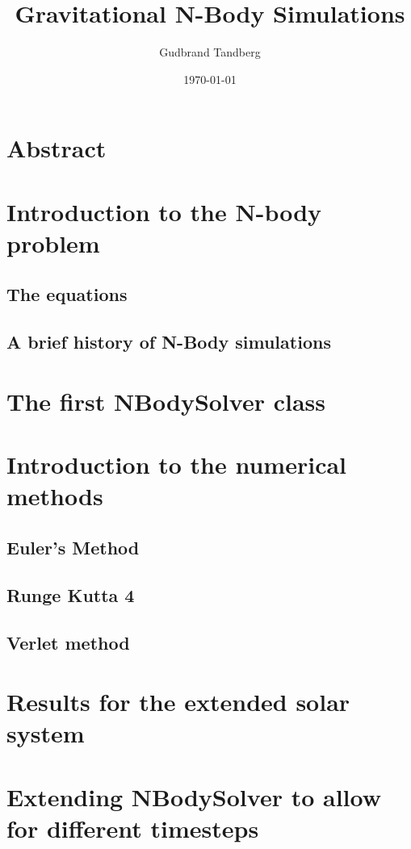 \documentclass[11pt, oneside]{article}   	%
\title{Gravitational N-Body Simulations}
\author{Gudbrand Tandberg}
\date{\today}							%
\begin{document}
\maketitle
\newpage


\section{Abstract}

\section{Introduction to the N-body problem}
\subsection{The equations}
\subsection{A brief history of N-Body simulations}

\section{The first NBodySolver class}

\section{Introduction to the numerical methods}
\subsection{Euler's Method}
\subsection{Runge Kutta 4}
\subsection{Verlet method}

\section{Results for the extended solar system}

\section{Extending NBodySolver to allow for different timesteps}
\end{document}
